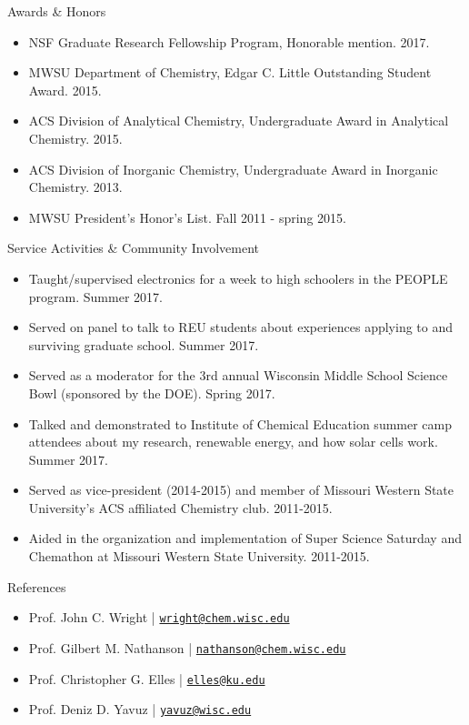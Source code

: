 \documentclass{resume} %
\begin{document}
\begin{rSection}{Awards \& Honors}

\begin{itemize}[leftmargin = 0 pt]
	\item  NSF Graduate Research Fellowship Program, Honorable mention. 2017.
	\item MWSU Department of Chemistry, Edgar C. Little Outstanding Student Award. 2015.
	\item ACS Division of Analytical Chemistry, Undergraduate Award in Analytical Chemistry. 2015. 
	\item ACS Division of Inorganic Chemistry, Undergraduate Award in Inorganic Chemistry. 2013.
	\item MWSU President’s Honor’s List. Fall 2011 - spring 2015.
\end{itemize}

\end{rSection}

\pagebreak

\begin{rSection}{Service Activities \& Community Involvement}

\begin{itemize}[leftmargin = 0 pt]
	\item Taught/supervised electronics for a week to high schoolers in the PEOPLE program. Summer 2017.
	\item Served on panel to talk to REU students about experiences applying to and surviving graduate school. Summer 2017.
	\item Served as a moderator for the 3rd annual Wisconsin Middle School Science Bowl (sponsored by the DOE). Spring 2017.
	\item Talked and demonstrated to Institute of Chemical Education summer camp attendees about my research, renewable energy, and how solar cells work. Summer 2017.  
	\item Served as vice-president (2014-2015) and member of Missouri Western State University's ACS affiliated Chemistry club. 2011-2015.
	\item Aided in the organization and implementation of Super Science Saturday and Chemathon at Missouri Western State University. 2011-2015.	
\end{itemize}

\end{rSection}

\begin{rSection}{References}
	\begin{itemize}[leftmargin = 0 pt]
		\item Prof. John C. Wright | \href{mailto:wright@chem.wisc.edu}{\texttt{wright@chem.wisc.edu}}
		\item Prof. Gilbert M. Nathanson | \href{mailto:nathanson@chem.wisc.edu}{\texttt{nathanson@chem.wisc.edu}}
		\item Prof. Christopher G. Elles | \href{mailto:elles@ku.edu}{\texttt{elles@ku.edu}}
		\item Prof. Deniz D. Yavuz | 	\href{mailto:yavuz@wisc.edu}{\texttt{yavuz@wisc.edu}}
	\end{itemize}
\end{rSection}
\end{document}
